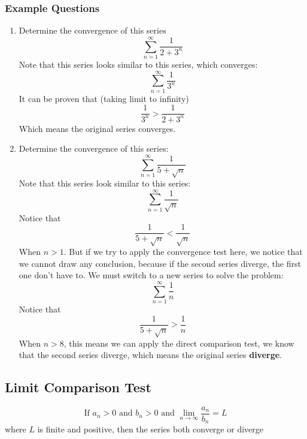 \documentclass{article}
\numberwithin{equation}{section}
\begin{document}
\subsubsection{Example Questions}
\begin{enumerate}
    \item Determine the convergence of this series
    \[
        \sum_{n = 1}^{\infty} \frac{1}{2 + 3^n}
    \]
    Note that this series looks similar to this series, which converges:
    \[
        \sum_{n = 1}^{\infty} \frac{1}{3^n}
    \]
    It can be proven that (taking limit to infinity)
    \[
        \frac{1}{3^n} > \frac{1}{2 + 3^n}
    \]
    Which means the original series converges.

    \newpage
    \item Determine the convergence of this series:
    \[
        \sum_{n = 1}^{\infty} \frac{1}{5 + \sqrt{n}}
    \]
    Note that this series look similar to this series:
    \[
        \sum_{n = 1}^{\infty} \frac{1}{\sqrt{n}} 
    \]
    Notice that 
    \[
        \frac{1}{5 + \sqrt{n}} < \frac{1}{\sqrt{n}}
    \]
    When $n > 1$. But if we try to apply the convergence test here, we notice that we cannot draw any conclusion,
    because if the second series diverge, the first one don't have to. We must switch to a new series to solve the problem:
    \[
        \sum_{n = 1}^{\infty}\frac{1}{n}
    \]
    Notice that 
    \[
        \frac{1}{5 + \sqrt{n}} > \frac{1}{n}
    \]
    When $n > 8$, this means we can apply the direct comparison test, we know that the second series diverge, 
    which means the original series \textbf{diverge}.
\end{enumerate}

\subsection{Limit Comparison Test}

\[
    \text{If } a_n > 0 \text{ and } b_n > 0 \text{ and } \lim_{n\to \infty} \frac{a_n}{b_n} = L 
\]
where $L$ is finite and positive, then the series both converge or diverge
\end{document}
